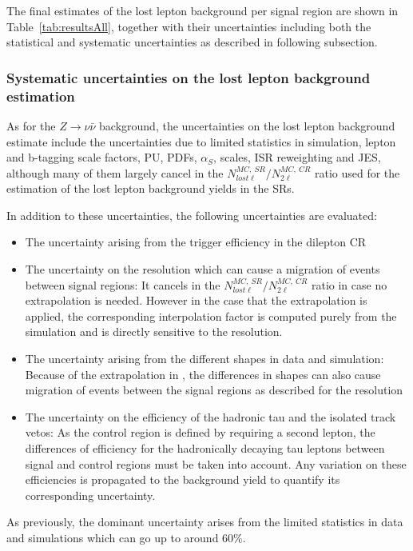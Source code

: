 The final estimates of the lost lepton background per signal region are shown in Table~\ref{tab:resultsAll}, together with their uncertainties including both the statistical and systematic uncertainties as described in following subsection.

\subsubsection{Systematic uncertainties on the lost lepton background estimation}

As for the $Z \to \nu \bar{\nu}$ background, the uncertainties on the lost lepton background estimate include the uncertainties due to limited statistics in simulation, lepton and b-tagging scale factors, PU,  PDFs, $\alpha_{S}$, scales, ISR reweighting and JES, although many of them largely cancel in the $N^{MC,~SR}_{lost \ell}/ N^{MC,~CR}_{2\ell}$ ratio used for the estimation of the lost lepton background yields in the SRs.

In addition to these uncertainties, the following uncertainties are evaluated:
\begin{itemize} 
\item The uncertainty arising from the trigger efficiency in the dilepton CR
\item The uncertainty on the \MET resolution which can cause a migration of events between signal regions: It cancels in the $N^{MC,~SR}_{lost \ell}/ N^{MC,~CR}_{2\ell}$ ratio in case no \MET extrapolation is needed. However in the case that the \MET extrapolation is applied, the corresponding interpolation factor is computed purely from the simulation and is directly sensitive to the \MET resolution.
\item The uncertainty arising from the different \MET shapes in data and simulation: Because of the extrapolation in \MET, the differences in \MET shapes  can also cause migration of events between the signal regions as described for the \MET resolution
\item The uncertainty on the efficiency of the hadronic tau and the isolated track vetos: As the control region is defined by requiring a second lepton, the differences of efficiency for the hadronically decaying tau leptons between signal and control regions must be taken into account. Any variation on these  efficiencies is propagated to the background yield to quantify its corresponding uncertainty.
\end{itemize}
As previously, the dominant uncertainty arises from the limited statistics in data and simulations which can go up to around 60\%.

